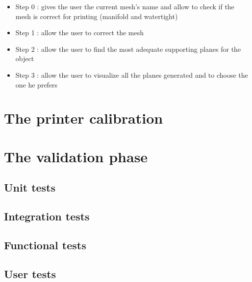 \documentclass{report}
\begin{document}
\begin{itemize}
\item Step 0 : gives the user the current mesh's name and allow to check if the mesh is correct for printing (manifold and watertight)
\item Step 1 : allow the user to correct the mesh
\item Step 2 : allow the user to find the most adequate supporting planes for the object
\item Step 3 : allow the user to visualize all the planes generated and to choose the one he prefers
\end{itemize}

\chapter{The printer calibration}

\chapter{The validation phase}

\section{Unit tests}

\section{Integration tests}

\section{Functional tests}

\section{User tests}


\appendix
\end{document}

